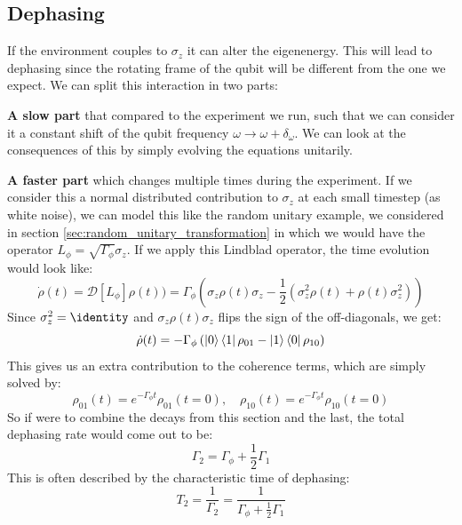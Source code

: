 \subsection{Dephasing}\label{sec:theory_t2}
If the environment couples to $\sigma_z$ it can alter the eigenenergy. This will lead to dephasing since the rotating frame of the qubit will be different from the one we expect. We can split this interaction in two parts:

\textbf{A slow part} that compared to the experiment we run, such that we can consider it a constant shift of the qubit frequency $\omega \to \omega + \delta_\omega$. We can look at the consequences of this by simply evolving the equations unitarily. 


\textbf{A faster part} which changes multiple times during the experiment. If we consider this a normal distributed contribution to $\sigma_z$ at each small timestep (as white noise), we can model this like the random unitary example, we considered in section \ref{sec:random_unitary_transformation} in which we would have the operator $L_\phi = \sqrt{\Gamma_\phi}\sigma_z$. If we apply this Lindblad operator, the time evolution would look like:
\begin{equation}
    \dot{\rho}(t) = \mathcal{D}[L_{\phi}]\rho(t)) = \Gamma_\phi\left(\sigma_z \rho(t) \sigma_z -\frac12( \sigma_z^2 \rho(t) + \rho(t) \sigma_z^2)\right)
\end{equation}
Since $\sigma_z^2 = \identity$ and $\sigma_z \rho(t) \sigma_z$ flips the sign of the off-diagonals, we get:
\begin{equation}
    \dot{\rho}(t) = - \Gamma_\phi \left(\ket{0}\bra{1}\rho_{01} - \ket{1}\bra{0}\rho_{10}\right)
\end{equation}
This gives us an extra contribution to the coherence terms, which are simply solved by:
\begin{equation}
    \rho_{01}(t) = e^{-\Gamma_\phi t}\rho_{01}(t=0), \quad \rho_{10}(t) = e^{-\Gamma_\phi t}\rho_{10}(t=0)
\end{equation}
So if were to combine the decays from this section and the last, the total dephasing rate would come out to be:
\begin{equation}
    \Gamma_2 = \Gamma_\phi + \frac12\Gamma_1 
\end{equation}
This is often described by the characteristic time of dephasing:
\begin{equation}\label{eq:t2_equation}
    T_2 = \frac{1}{\Gamma_2} = \frac{1}{\Gamma_\phi + \frac12\Gamma_1 } 
\end{equation}



